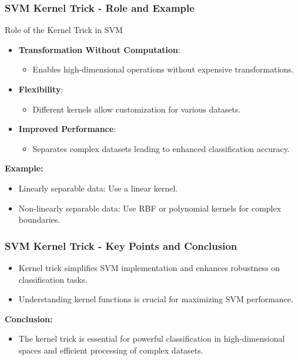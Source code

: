 \documentclass[aspectratio=169]{beamer}
\begin{document}
\begin{frame}[fragile]
    \frametitle{SVM Kernel Trick - Role and Example}
    \begin{block}{Role of the Kernel Trick in SVM}
    \begin{itemize}
        \item \textbf{Transformation Without Computation}:
        \begin{itemize}
            \item Enables high-dimensional operations without expensive transformations.
        \end{itemize}
        \item \textbf{Flexibility}:
        \begin{itemize}
            \item Different kernels allow customization for various datasets.
        \end{itemize}
        \item \textbf{Improved Performance}:
        \begin{itemize}
            \item Separates complex datasets leading to enhanced classification accuracy.
        \end{itemize}
    \end{itemize}
    \end{block}

    \textbf{Example:}
    \begin{itemize}
        \item Linearly separable data: Use a linear kernel.
        \item Non-linearly separable data: Use RBF or polynomial kernels for complex boundaries.
    \end{itemize}
\end{frame}

\begin{frame}[fragile]
    \frametitle{SVM Kernel Trick - Key Points and Conclusion}
    \begin{itemize}
        \item Kernel trick simplifies SVM implementation and enhances robustness on classification tasks.
        \item Understanding kernel functions is crucial for maximizing SVM performance.
    \end{itemize}
    
    \textbf{Conclusion:}
    \begin{itemize}
        \item The kernel trick is essential for powerful classification in high-dimensional spaces and efficient processing of complex datasets.
    \end{itemize}
\end{frame}
\end{document}
